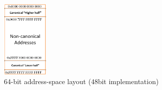 \begin{figure}
\centering
 	\includegraphics[width=0.2\textwidth]{Picture3-png}
\caption{64-bit address-space layout (48bit implementation)}\label{fig:addrspace}
\end{figure}


